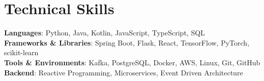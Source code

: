 \documentclass[letterpaper,10pt]{article}
\begin{document}
\section{Technical Skills}
 \begin{itemize}[leftmargin=0.15in, label={}]
    \small{\item{
     \textbf{Languages}{: Python, Java, Kotlin, JavaScript, TypeScript, SQL} \\
     \textbf{Frameworks \& Libraries}{: Spring Boot, Flask, React, TensorFlow, PyTorch, scikit-learn} \\
     \textbf{Tools \& Environments}{: Kafka, PostgreSQL, Docker, AWS, Linux, Git, GitHub} \\
     \textbf{Backend}{: Reactive Programming, Microservices, Event Driven Architecture} \\
    }}
 \end{itemize}
\end{document}
